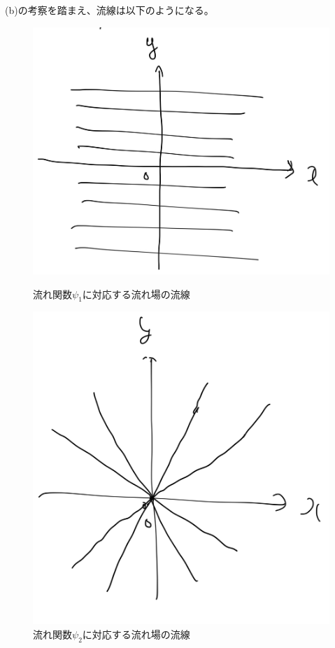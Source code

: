 \documentclass[a4paper]{jsarticle}
\begin{document}
\subsubsection{}
(b)の考察を踏まえ、流線は以下のようになる。
\begin{figure}[htb]
  \begin{minipage}[b]{0.5\hsize}
    \centering
    \includegraphics[width=0.7\hsize]{fig1.png}
    \caption{流れ関数$\psi_1$に対応する流れ場の流線}
  \end{minipage}
  \begin{minipage}[b]{0.5\hsize}
    \centering
    \includegraphics[width=0.7\hsize]{fig2.png}
    \caption{流れ関数$\psi_2$に対応する流れ場の流線}
  \end{minipage}
\end{figure}
\end{document}
